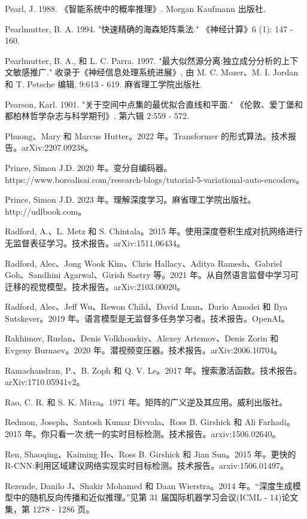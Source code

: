 \documentclass[10pt]{article}
\begin{document}
Pearl, J. 1988. 《智能系统中的概率推理》. Morgan Kaufmann 出版社.

Pearlmutter, B. A. 1994. "快速精确的海森矩阵乘法." 《神经计算》6 (1): 147 - 160.

Pearlmutter, B. A., 和 L. C. Parra. 1997. "最大似然源分离:独立成分分析的上下文敏感推广." 收录于《神经信息处理系统进展》, 由 M. C. Mozer、M. I. Jordan 和 T. Petsche 编辑, 9:613 - 619. 麻省理工学院出版社.

Pearson, Karl. 1901. "关于空间中点集的最优拟合直线和平面." 《伦敦、爱丁堡和都柏林哲学杂志与科学期刊》, 第六辑 2:559 - 572.

Phuong、Mary 和 Marcus Hutter。2022 年。Transformer 的形式算法。技术报告。arXiv:2207.09238。

Prince, Simon J.D. 2020 年。变分自编码器。https://www.borealisai.com/research-blogs/tutorial-5-variational-auto-encoders。

Prince, Simon J.D. 2023 年。理解深度学习。麻省理工学院出版社。http://udlbook.com。

Radford, A.、L. Metz 和 S. Chintala。2015 年。使用深度卷积生成对抗网络进行无监督表征学习。技术报告。arXiv:1511.06434。

Radford, Alec、Jong Wook Kim、Chris Hallacy、Aditya Ramesh、Gabriel Goh、Sandhini Agarwal、Girish Sastry 等。2021 年。从自然语言监督中学习可迁移的视觉模型。技术报告。arXiv:2103.00020。

Radford, Alec、Jeff Wu、Rewon Child、David Luan、Dario Amodei 和 Ilya Sutskever。2019 年。语言模型是无监督多任务学习者。技术报告。OpenAI。

Rakhimov, Ruslan、Denis Volkhonskiy、Alexey Artemov、Denis Zorin 和 Evgeny Burnaev。2020 年。潜视频变压器。技术报告。arXiv:2006.10704。

Ramachandran, P.、B. Zoph 和 Q. V. Le。2017 年。搜索激活函数。技术报告。arXiv:1710.05941v2。

Rao, C. R. 和 S. K. Mitra。1971 年。矩阵的广义逆及其应用。威利出版社。

Redmon, Joseph、Santosh Kumar Divvala、Ross B. Girshick 和 Ali Farhadi。2015 年。你只看一次:统一的实时目标检测。技术报告。arxiv:1506.02640。

Ren, Shaoqing、Kaiming He、Ross B. Girshick 和 Jian Sun。2015 年。更快的 R-CNN:利用区域建议网络实现实时目标检测。技术报告。arxiv:1506.01497。

Rezende, Danilo J、Shakir Mohamed 和 Daan Wierstra。2014 年。“深度生成模型中的随机反向传播和近似推理。”见第 31 届国际机器学习会议(ICML - 14)论文集，第 1278 - 1286 页。
\end{document}
